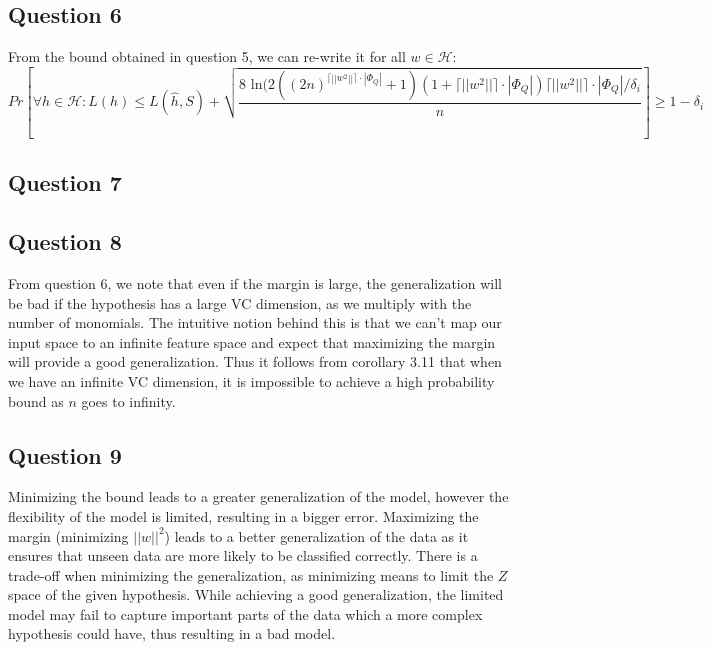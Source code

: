 \documentclass{article}
\begin{document}
\subsection{Question 6}
From the bound obtained in question 5, we can re-write it for all $w \in \mathcal{H}$:
\begin{equation}
Pr \left[ \forall h \in \mathcal{H}: L(h) \leq L(\hat{h},S)+
\sqrt{ \dfrac{8 \text{ ln} (2((2n)^{\lceil || w^2|| \rceil \cdot| \Phi_Q|}+1) (1+ \lceil || w^2|| \rceil \cdot| \Phi_Q|) \lceil || w^2|| \rceil \cdot| \Phi_Q|  / \delta_i}{n}} \right] \geq 1- \delta_i 
\end{equation} 
\subsection{Question 7}

\subsection{Question 8}
From question 6, we note that even if the margin is large, the generalization will be bad if the hypothesis has a large VC dimension, as we multiply with the number of monomials. The intuitive notion behind this is that we can't map our input space to an infinite feature space and expect that maximizing the margin will provide a good generalization. Thus it follows from corollary 3.11 that when we have an infinite VC dimension, it is impossible to achieve a high probability bound as $n$ goes to infinity. 
\subsection{Question 9}
Minimizing the bound leads to a greater generalization of the model, however the flexibility of the model is limited, resulting in a bigger error. Maximizing the margin (minimizing $||w||^2$) leads to a better generalization of the data as it ensures that unseen data are more likely to be classified correctly. There is a trade-off when minimizing the generalization, as minimizing means to limit the $Z$ space of the given hypothesis. While achieving a good generalization, the limited model may fail to capture important parts of the data which a more complex hypothesis could have, thus resulting in a bad model. 
\end{document}
